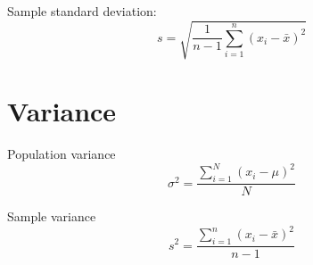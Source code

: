 \documentclass{article}
\begin{document}
Sample standard deviation:
\[
s = \sqrt{\frac{1}{n-1} \sum_{i=1}^n (x_i - \bar{x})^2}
\]
\hspace{0.5cm}

\section*{Variance}


\hspace{0.5cm}

Population variance
\[
\sigma^2 = \frac{\displaystyle\sum_{i=1}^{N}(x_i - \mu)^2} {N}
\]

Sample variance
\[
s^2 = \frac{\displaystyle\sum_{i=1}^{n}(x_i - \bar{x})^2} {n-1}

\]
\end{document}
